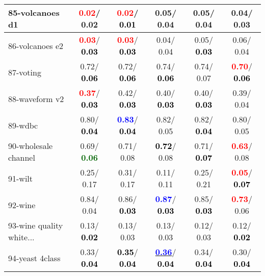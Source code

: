\begin{table}[h]
\begin{center}
\begin{tabular}{lc|c|c|c|c}
85-volcanoes d1 & \textcolor{red}{\textbf{  0.02}}/  0.02 & \textcolor{red}{\textbf{  0.02}}/\textcolor{black}{\textbf{  0.01}} &   0.05/  0.04 &   0.05/  0.04 &   0.04/  0.03 \\ \hline
86-volcanoes e2 & \textcolor{red}{\textbf{  0.03}}/\textcolor{black}{\textbf{  0.03}} & \textcolor{red}{\textbf{  0.03}}/\textcolor{black}{\textbf{  0.03}} &   0.04/  0.04 &   0.05/\textcolor{black}{\textbf{  0.03}} &   0.06/  0.04 \\
87-voting &   0.72/\textcolor{black}{\textbf{  0.06}} &   0.72/\textcolor{black}{\textbf{  0.06}} &   0.74/\textcolor{black}{\textbf{  0.06}} &   0.74/  0.07 & \textcolor{red}{\textbf{  0.70}}/\textcolor{black}{\textbf{  0.06}} \\
88-waveform v2 & \textcolor{red}{\textbf{  0.37}}/\textcolor{black}{\textbf{  0.03}} &   0.42/\textcolor{black}{\textbf{  0.03}} &   0.40/\textcolor{black}{\textbf{  0.03}} &   0.40/\textcolor{black}{\textbf{  0.03}} &   0.39/  0.04 \\
89-wdbc &   0.80/\textcolor{black}{\textbf{  0.04}} & \textcolor{blue}{\textbf{  0.83}}/\textcolor{black}{\textbf{  0.04}} &   0.82/  0.05 &   0.82/\textcolor{black}{\textbf{  0.04}} &   0.80/  0.05 \\
90-wholesale channel &   0.69/\textcolor{darkgreen}{\textbf{  0.06}} &   0.71/  0.08 & \textcolor{black}{\textbf{  0.72}}/  0.08 &   0.71/\textcolor{black}{\textbf{  0.07}} & \textcolor{red}{\textbf{  0.63}}/  0.08 \\
91-wilt &   0.25/  0.17 &   0.31/  0.17 &   0.11/  0.11 &   0.25/  0.21 & \textcolor{red}{\textbf{  0.05}}/\textcolor{black}{\textbf{  0.07}} \\
92-wine &   0.84/  0.04 &   0.86/\textcolor{black}{\textbf{  0.03}} & \textcolor{blue}{\textbf{  0.87}}/\textcolor{black}{\textbf{  0.03}} &   0.85/\textcolor{black}{\textbf{  0.03}} & \textcolor{red}{\textbf{  0.73}}/  0.06 \\ \hline
93-wine quality white... &   0.13/\textcolor{black}{\textbf{  0.02}} &   0.13/  0.03 &   0.13/  0.03 &   0.12/  0.03 &   0.12/\textcolor{black}{\textbf{  0.02}} \\
94-yeast 4class &   0.33/\textcolor{black}{\textbf{  0.04}} & \textcolor{black}{\textbf{  0.35}}/\textcolor{black}{\textbf{  0.04}} & \underline{\textcolor{blue}{\textbf{  0.36}}}/\textcolor{black}{\textbf{  0.04}} &   0.34/\textcolor{black}{\textbf{  0.04}} &   0.30/\textcolor{black}{\textbf{  0.04}} \\\end{tabular}\label{stratsALCKappa2bELMRedux}
\end{center}
\end{table}